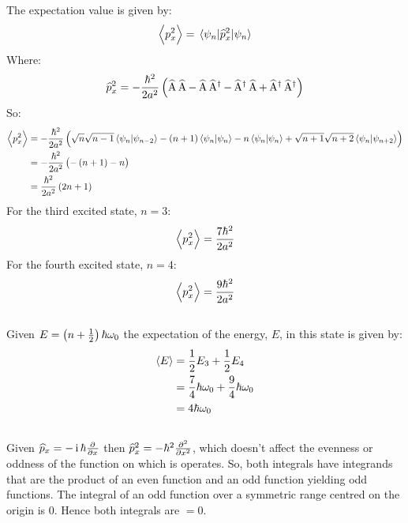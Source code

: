 \subsection{}
The expectation value is given by:
\begin{equation*}
    \expectationvalue{p_x^2} = \expectationvalue{\widehat{p}_x^2}{\psi_n}
\end{equation*}
Where:
\begin{equation*}
    \widehat{p}_x^2 = - \frac{\hbar^2}{2a^2} \del{\loweringoperator \loweringoperator - \loweringoperator \raisingoperator - \raisingoperator \loweringoperator + \raisingoperator \raisingoperator}
\end{equation*}
So:
\begin{align*}
    \expectationvalue{p_x^2} & = - \frac{\hbar^2}{2a^2} \del{\sqrt{n} \sqrt{n-1} \braket{\psi_n}{\psi_{n-2}} - \del{n+1} \braket{\psi_n} - n \braket{\psi_n} + \sqrt{n+1} \sqrt{n+2} \braket{\psi_n}{\psi_{n+2}}}\\
    & =  - \frac{\hbar^2}{2a^2} \del{- \del{n+1} - n}\\
    & = \frac{\hbar^2}{2a^2} \del{2n + 1}
\end{align*}
For the third excited state, $ n = 3 $:
\begin{equation*}
    \expectationvalue{p_x^2} = \frac{7 \hbar^2}{2a^2}
\end{equation*}
For the fourth excited state, $ n = 4 $:
\begin{equation*}
    \expectationvalue{p_x^2} = \frac{9 \hbar^2}{2a^2}
\end{equation*}

\subsection{}
Given $ E = \del{n + \frac{1}{2}} \hbar \omega_0 $ the expectation of the energy, $ E $, in this state is given by:
\begin{align*}
    \expectationvalue{E} & = \frac{1}{2}E_3 + \frac{1}{2}E_4\\
    & = \frac{7}{4} \hbar \omega_0 + \frac{9}{4} \hbar \omega_0\\
    & = 4 \hbar \omega_0
\end{align*}

\subsection{}
Given $ \widehat{p}_x = -\operatorname{i} \hbar \pd{}{x} $ then $ \widehat{p}_x^2 = - \hbar^2 \pd[2]{}{x} $, which doesn't affect the evenness or oddness of the function on which is operates. So, both integrals have integrands that are the product of an even function and an odd function yielding odd functions. The integral of an odd function over a symmetric range centred on the origin is 0. Hence both integrals are $ = 0 $.

